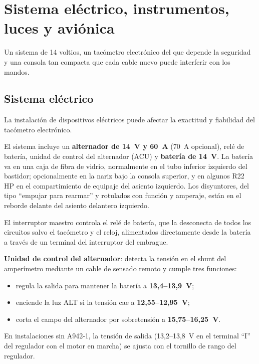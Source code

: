 \chapter{Sistema eléctrico, instrumentos, luces y aviónica}
\label{cap:mm-electrico}

\opening{Un sistema de 14 voltios, un tacómetro electrónico del que depende la seguridad y una consola tan compacta que cada cable nuevo puede interferir con los mandos.}

\section{Sistema eléctrico}

\begin{precaucion}
La instalación de dispositivos eléctricos puede afectar la exactitud y fiabilidad del tacómetro electrónico.
\end{precaucion}

El sistema incluye un \textbf{alternador de 14~V y 60~A} (70~A opcional), relé de batería, unidad de control del alternador (ACU) y \textbf{batería de 14~V}. La batería va en una caja de fibra de vidrio, normalmente en el tubo inferior izquierdo del bastidor; opcionalmente en la nariz bajo la consola superior, y en algunos R22 HP en el compartimiento de equipaje del asiento izquierdo. Los disyuntores, del tipo ``empujar para rearmar'' y rotulados con función y amperaje, están en el reborde delante del asiento delantero izquierdo.

El interruptor maestro controla el relé de batería, que la desconecta de todos los circuitos salvo el tacómetro y el reloj, alimentados directamente desde la batería a través de un terminal del interruptor del embrague.

\textbf{Unidad de control del alternador}: detecta la tensión en el shunt del amperímetro mediante un cable de sensado remoto y cumple tres funciones:
\begin{itemize}
\item regula la salida para mantener la batería a \textbf{13,4--13,9~V};
\item enciende la luz ALT si la tensión cae a \textbf{12,55--12,95~V};
\item corta el campo del alternador por sobretensión a \textbf{15,75--16,25~V}.
\end{itemize}

En instalaciones sin A942-1, la tensión de salida (13,2--13,8~V en el terminal ``I'' del regulador con el motor en marcha) se ajusta con el tornillo de rango del regulador.


